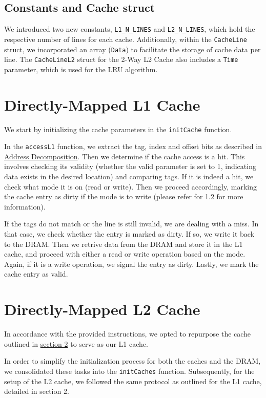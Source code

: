 \documentclass[12pt]{article}
\begin{document}
    \subsection{Constants and Cache struct}
    We introduced two new constants, \texttt{L1\_N\_LINES} and \texttt{L2\_N\_LINES}, which hold the respective number of lines for each cache.
    Additionally, within the \texttt{CacheLine} struct, we incorporated an array (\texttt{Data}) to facilitate the storage of cache data per line.
    The \texttt{CacheLineL2} struct for the 2-Way L2 Cache also includes a \texttt{Time} parameter, which is used for the LRU algorithm.

    \section{Directly-Mapped L1 Cache} \label{S2}

    We start by initializing the cache parameters in the \texttt{initCache} function.

    In the \texttt{accessL1} function, we extract the tag, index and offset bits as described in \hyperref[AD]{Address Decomposition}. Then we determine if the cache access is a hit. This involves checking
    its validity (whether the valid parameter is set to 1, indicating data exists in the desired location) and comparing tags. If it is indeed a hit, we check what mode it is on (read or write). Then
    we proceed accordingly, marking the cache entry as dirty if the mode is to write (please refer for 1.2 for more information).

    If the tags do not match or the line is still invalid, we are dealing with a miss. In that case, we check whether the entry is marked as dirty. If so, we write it back to the DRAM. Then we retrive
    data from the DRAM and store it in the L1 cache, and proceed with either a read or write operation based on the mode. Again, if it is a write operation, we signal the entry as dirty. Lastly, we mark the cache entry as valid.

    \section{Directly-Mapped L2 Cache}

    In accordance with the provided instructions, we opted to repurpose the cache outlined in \hyperref[S2]{section 2} to serve as our L1 cache.

    In order to simplify the initialization process for both the caches and the DRAM, we consolidated these tasks into the \texttt{initCaches}
    function. Subsequently, for the setup of the L2 cache, we followed the same protocol as outlined for the L1 cache, detailed in section 2.
\end{document}
